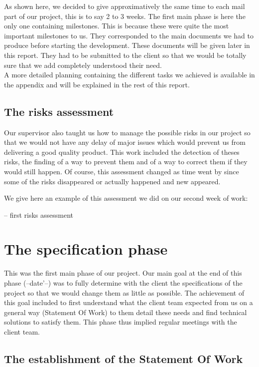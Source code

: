\documentclass{report}
\begin{document}
As shown here, we decided to give approximatively the same time to each mail part of our project, this is to say 2 to 3 weeks. The first main phase is here the only one containing milestones. This is because these were quite the most important milestones to us. They corresponded to the main documents we had to produce before starting the development. These documents will be given later in this report. They had to be submitted to the client so that we would be totally sure that we add completely understood their need. \\

A more detailed planning containing the different tasks we achieved is available in the appendix and will be explained in the rest of this report.

\section{The risks assessment}

Our supervisor also taught us how to manage the possible risks in our project so that we would not have any delay of major issues which would prevent us from delivering a good quality product. This work included the detection of theses risks, the finding of a way to prevent them and of a way to correct them if they would still happen. Of course, this assessment changed as time went by since some of the risks disappeared or actually happened and new appeared.

We give here an example of this assessment we did on our second week of work:

\bigskip
-- first risks assessment
\bigskip

\chapter{The specification phase}

This was the first main phase of our project. Our main goal at the end of this phase (--date'--)  was to fully determine with the client the specifications of the project so that we would change them as little as possible. The achievement  of this goal included to first understand what the client team expected from us on a general way (Statement Of Work) to them detail these needs and find technical solutions to satisfy them. This phase thus implied regular meetings with the client team.

\section{The establishment of the Statement Of Work}
\end{document}
